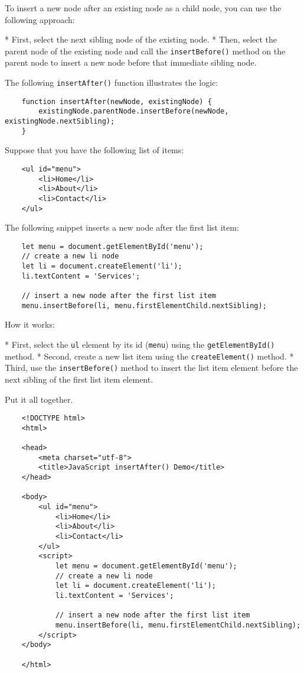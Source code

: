 \documentclass[11pt]{article}
\begin{document}
\noindent
To insert a new node after an existing node as a child node,
you can use the following approach:

* First, select the next sibling node of the existing node.
* Then, select the parent node of the existing node and call
the \verb|insertBefore()| method on the parent node to insert a new node
before that immediate sibling node.

\noindent
The following \verb|insertAfter()| function illustrates the logic:

\begin{lstlisting}
    function insertAfter(newNode, existingNode) {
        existingNode.parentNode.insertBefore(newNode, existingNode.nextSibling);
    }
\end{lstlisting}

\noindent
Suppose that you have the following list of items:

\begin{lstlisting}
    <ul id="menu">
        <li>Home</li>   
        <li>About</li>
        <li>Contact</li>
    </ul>
\end{lstlisting}

\noindent
The following snippet inserts a new node after the first list item:

\begin{lstlisting}
    let menu = document.getElementById('menu');
    // create a new li node
    let li = document.createElement('li');
    li.textContent = 'Services';

    // insert a new node after the first list item
    menu.insertBefore(li, menu.firstElementChild.nextSibling);
\end{lstlisting}

\noindent
How it works:

* First, select the \verb|ul| element by its id (\verb|menu|) using
the \verb|getElementById()| method.
* Second, create a new list item using the \verb|createElement()| method.
* Third, use the \verb|insertBefore()| method to insert the list item element
before the next sibling of the first list item element.

Put it all together.

\begin{lstlisting}
    <!DOCTYPE html>
    <html>

    <head>
        <meta charset="utf-8">
        <title>JavaScript insertAfter() Demo</title>
    </head>

    <body>
        <ul id="menu">
            <li>Home</li>
            <li>About</li>
            <li>Contact</li>
        </ul>
        <script>
            let menu = document.getElementById('menu');
            // create a new li node
            let li = document.createElement('li');
            li.textContent = 'Services';

            // insert a new node after the first list item
            menu.insertBefore(li, menu.firstElementChild.nextSibling);
        </script>
    </body>

    </html>
\end{lstlisting}
\end{document}
